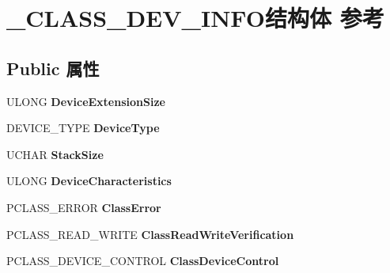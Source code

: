 \hypertarget{struct___c_l_a_s_s___d_e_v___i_n_f_o}{}\section{\+\_\+\+C\+L\+A\+S\+S\+\_\+\+D\+E\+V\+\_\+\+I\+N\+F\+O结构体 参考}
\label{struct___c_l_a_s_s___d_e_v___i_n_f_o}
\subsection*{Public 属性}
\begin{DoxyCompactItemize}
\item 
\mbox{\label{struct___c_l_a_s_s___d_e_v___i_n_f_o_a930899f1cfb031f036e47b7e2e4ae4b7}} 
U\+L\+O\+NG {\bfseries Device\+Extension\+Size}
\item 
\mbox{\label{struct___c_l_a_s_s___d_e_v___i_n_f_o_a680d670102cffe210a1245dc936fbafa}} 
D\+E\+V\+I\+C\+E\+\_\+\+T\+Y\+PE {\bfseries Device\+Type}
\item 
\mbox{\label{struct___c_l_a_s_s___d_e_v___i_n_f_o_a509a088ab571ec62c7434a2e0aa2b3b6}} 
U\+C\+H\+AR {\bfseries Stack\+Size}
\item 
\mbox{\label{struct___c_l_a_s_s___d_e_v___i_n_f_o_a1c9dbe2710f131b6edd3f1751706b7d4}} 
U\+L\+O\+NG {\bfseries Device\+Characteristics}
\item 
\mbox{\label{struct___c_l_a_s_s___d_e_v___i_n_f_o_af21213a72497913fed6557fae5945f36}} 
P\+C\+L\+A\+S\+S\+\_\+\+E\+R\+R\+OR {\bfseries Class\+Error}
\item 
\mbox{\label{struct___c_l_a_s_s___d_e_v___i_n_f_o_a62ceeb9aeb7d7c4263231c0267a48031}} 
P\+C\+L\+A\+S\+S\+\_\+\+R\+E\+A\+D\+\_\+\+W\+R\+I\+TE {\bfseries Class\+Read\+Write\+Verification}
\item 
\mbox{\label{struct___c_l_a_s_s___d_e_v___i_n_f_o_aaf76bc8698f405fa74f5e62652403e18}} 
P\+C\+L\+A\+S\+S\+\_\+\+D\+E\+V\+I\+C\+E\+\_\+\+C\+O\+N\+T\+R\+OL {\bfseries Class\+Device\+Control}

\end{DoxyCompactItemize}
